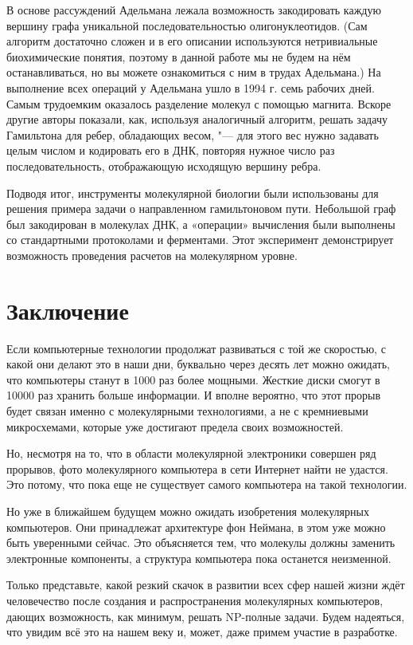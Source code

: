 \documentclass[titlepage, 12pt]{article}
\begin{document}
В основе рассуждений Адельмана лежала возможность закодировать каждую вершину графа уникальной последовательностью олигонуклеотидов. (Сам алгоритм достаточно сложен и в его описании используются нетривиальные биохимические понятия, поэтому в данной работе мы не будем на нём останавливаться, но вы можете ознакомиться с ним в трудах Адельмана.) На выполнение всех операций у Адельмана ушло в 1994 г. семь рабочих дней. Самым трудоемким оказалось разделение молекул с помощью магнита. Вскоре другие авторы показали, как, используя аналогичный алгоритм, решать задачу Гамильтона для ребер, обладающих весом, "--- для этого вес нужно задавать целым числом и кодировать его в ДНК, повторяя нужное число раз последовательность, отображающую исходящую вершину ребра.

Подводя итог, инструменты молекулярной биологии были использованы для решения примера задачи о направленном гамильтоновом пути. Небольшой граф был закодирован в молекулах ДНК, а «операции» вычисления были выполнены со стандартными протоколами и ферментами. Этот эксперимент демонстрирует возможность проведения расчетов на молекулярном уровне.


\newpage
\section*{Заключение}
Если компьютерные технологии продолжат развиваться с той же скоростью, с какой они делают это в наши дни, буквально через десять лет можно ожидать, что компьютеры станут в 1000 раз более мощными. Жесткие диски смогут в 10000 раз хранить больше информации. И вполне вероятно, что этот прорыв будет связан именно с молекулярными технологиями, а не с кремниевыми микросхемами, которые уже достигают предела своих возможностей.

Но, несмотря на то, что в области молекулярной электроники совершен ряд прорывов, фото молекулярного компьютера в сети Интернет найти не удастся. Это потому, что пока еще не существует самого компьютера на такой технологии.

Но уже в ближайшем будущем можно ожидать изобретения молекулярных компьютеров. Они принадлежат архитектуре фон Неймана, в этом уже можно быть уверенными сейчас. Это объясняется тем, что молекулы должны заменить электронные компоненты, а структура компьютера пока останется неизменной.

Только представьте, какой резкий скачок в развитии всех сфер нашей жизни ждёт человечество после создания и распространения молекулярных компьютеров, дающих возможность, как минимум, решать NP-полные задачи. Будем надеяться, что увидим всё это на нашем веку и, может, даже примем участие в разработке.
\end{document}
